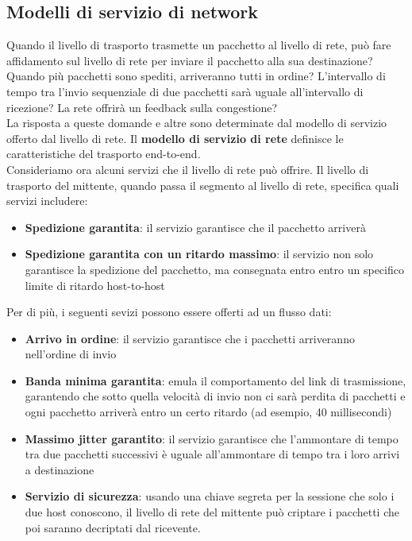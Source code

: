 \documentclass[11pt,a4paper]{book}
\begin{document}
\subsection{Modelli di servizio di network}
Quando il livello di trasporto trasmette un pacchetto al livello di rete, può fare affidamento sul livello di rete per inviare il pacchetto alla sua destinazione? Quando più pacchetti sono spediti, arriveranno tutti in ordine? L'intervallo di tempo tra l'invio sequenziale di due pacchetti sarà uguale all'intervallo di ricezione? La rete offrirà un feedback sulla congestione? \\
La risposta a queste domande e altre sono determinate dal modello di servizio offerto dal livello di rete. Il \textbf{modello di servizio di rete} definisce le caratteristiche del trasporto end-to-end. \\
Consideriamo ora alcuni servizi che il livello di rete può offrire. Il livello di trasporto del mittente, quando passa il segmento al livello di rete, specifica quali servizi includere:
\begin{itemize}
	\item \textbf{Spedizione garantita}: il servizio garantisce che il pacchetto arriverà
	\item \textbf{Spedizione garantita con un ritardo massimo}: il servizio non solo garantisce la spedizione del pacchetto, ma consegnata entro entro un specifico limite di ritardo host-to-host
\end{itemize}
Per di più, i seguenti sevizi possono essere offerti ad un flusso dati:
\begin{itemize}
	\item \textbf{Arrivo in ordine}: il servizio garantisce che i pacchetti arriveranno nell'ordine di invio
	\item \textbf{Banda minima garantita}: emula il comportamento del link di trasmissione, garantendo che sotto quella velocità di invio non ci sarà perdita di pacchetti e ogni pacchetto arriverà entro un certo ritardo (ad esempio, 40 millisecondi)
	\item \textbf{Massimo jitter garantito}: il servizio garantisce che l'ammontare di tempo tra due pacchetti successivi è uguale all'ammontare di tempo tra i loro arrivi a destinazione
	\item \textbf{Servizio di sicurezza}: usando una chiave segreta per la sessione che solo i due host conoscono, il livello di rete del mittente può criptare i pacchetti che poi saranno decriptati dal ricevente.
\end{itemize}
\end{document}
